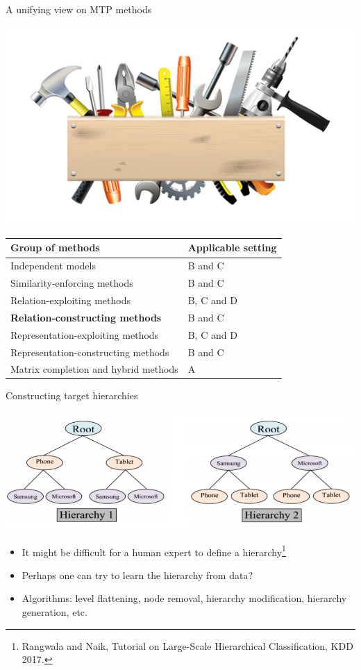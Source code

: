 \documentclass[]{beamer}
\renewcommand{\alert}[1]{\textbf{\color{putblue} #1}}
\begin{document}
\begin{frame}{A unifying view on MTP methods}

\begin{center}
\includegraphics[scale=0.3]{pics/tools}

\begin{tabular}{ll}
\hline
Group of methods & Applicable setting \\
\hline
\hline
Independent models & B and C \\
Similarity-enforcing methods & B and C   \\ 
Relation-exploiting methods & B, C and D  \\
\alert{Relation-constructing methods} & B and C \\
Representation-exploiting methods & B, C and D \\
Representation-constructing methods & B and C \\
Matrix completion and hybrid methods & A \\
\hline  
\end{tabular}
\end{center}
\end{frame}

\begin{frame}{Constructing target hierarchies}

\includegraphics[width=\textwidth]{pics/hierarchies}

\begin{itemize}
\item It might be difficult for a human expert to define a hierarchy\footnote{Rangwala and Naik, Tutorial on Large-Scale Hierarchical Classification, KDD 2017.}
\item Perhaps one can try to learn the hierarchy from data? 
\item Algorithms: level flattening, node removal, hierarchy modification, hierarchy generation, etc.
\end{itemize}


\end{frame}
\end{document}
